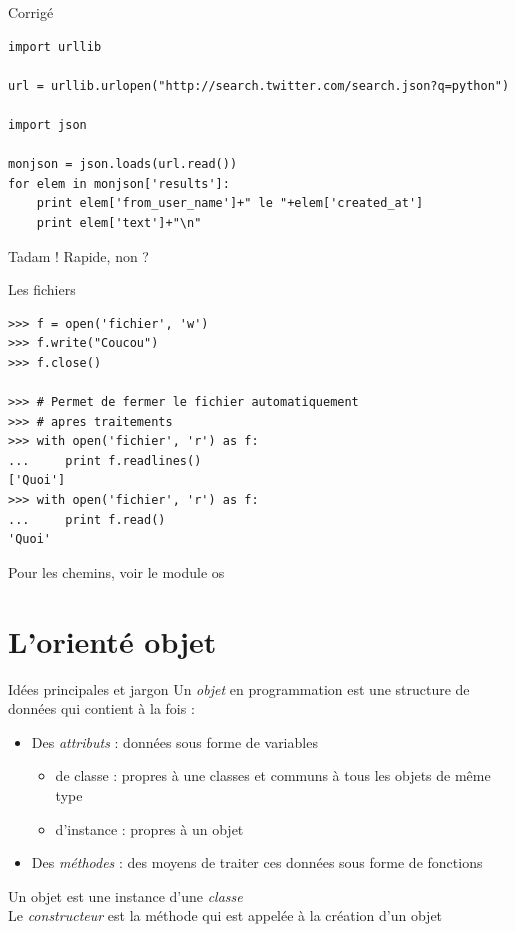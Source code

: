 \documentclass{beamer}
\begin{document}
\begin{frame}[fragile]{Corrigé}
\begin{lstlisting}[basicstyle=\tiny]
import urllib

url = urllib.urlopen("http://search.twitter.com/search.json?q=python")

import json

monjson = json.loads(url.read())
for elem in monjson['results']:
    print elem['from_user_name']+" le "+elem['created_at']
    print elem['text']+"\n"
\end{lstlisting}

Tadam ! Rapide, non ?
\end{frame}


\begin{frame}[fragile]{Les fichiers}
\begin{lstlisting}
>>> f = open('fichier', 'w')
>>> f.write("Coucou")
>>> f.close()

>>> # Permet de fermer le fichier automatiquement 
>>> # apres traitements
>>> with open('fichier', 'r') as f:
...     print f.readlines()
['Quoi']
>>> with open('fichier', 'r') as f:
...     print f.read()
'Quoi'
\end{lstlisting}
Pour les chemins, voir le module os
\end{frame}

\section{L'orienté objet}

\begin{frame}[fragile]{Idées principales et jargon}
Un \textit{objet} en programmation est une structure de données qui contient à la fois :
\begin{itemize}
 \item Des \textit{attributs} : données sous forme de variables
  \begin{itemize}
    \item de classe : propres à une classes et communs à tous les objets de même type
    \item d'instance : propres à un objet
  \end{itemize}
 \item Des \textit{méthodes} : des moyens de traiter ces données sous forme de fonctions 
\end{itemize}
Un objet est une instance d'une \textit{classe}\\
Le \textit{constructeur} est la méthode qui est appelée à la création d'un objet
\end{frame}
\end{document}
